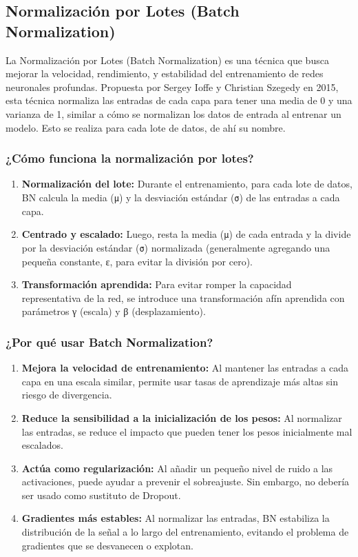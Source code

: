 \documentclass[11pt]{article}
\begin{document}
\subsection{Normalización por Lotes (Batch Normalization)}
\label{sec:org718c32e}
La Normalización por Lotes (Batch Normalization) es una técnica que
busca mejorar la velocidad, rendimiento, y estabilidad del entrenamiento
de redes neuronales profundas. Propuesta por Sergey Ioffe y Christian
Szegedy en 2015, esta técnica normaliza las entradas de cada capa para
tener una media de 0 y una varianza de 1, similar a cómo se normalizan
los datos de entrada al entrenar un modelo. Esto se realiza para cada
lote de datos, de ahí su nombre.

\subsubsection{¿Cómo funciona la normalización por lotes?}
\label{sec:org4655f71}
\begin{enumerate}
\item \textbf{Normalización del lote:} Durante el entrenamiento, para cada lote de
datos, BN calcula la media (\texttt{µ}) y la desviación estándar (\texttt{σ}) de
las entradas a cada capa.
\item \textbf{Centrado y escalado:} Luego, resta la media (\texttt{µ}) de cada entrada y
la divide por la desviación estándar (\texttt{σ}) normalizada (generalmente
agregando una pequeña constante, ε, para evitar la división por
cero).
\item \textbf{Transformación aprendida:} Para evitar romper la capacidad
representativa de la red, se introduce una transformación afín
aprendida con parámetros γ (escala) y β (desplazamiento).
\end{enumerate}

\subsubsection{¿Por qué usar Batch Normalization?}
\label{sec:orgb573865}
\begin{enumerate}
\item \textbf{Mejora la velocidad de entrenamiento:} Al mantener las entradas a
cada capa en una escala similar, permite usar tasas de aprendizaje
más altas sin riesgo de divergencia.

\item \textbf{Reduce la sensibilidad a la inicialización de los pesos:} Al
normalizar las entradas, se reduce el impacto que pueden tener los
pesos inicialmente mal escalados.

\item \textbf{Actúa como regularización:} Al añadir un pequeño nivel de ruido a
las activaciones, puede ayudar a prevenir el sobreajuste. Sin
embargo, no debería ser usado como sustituto de Dropout.

\item \textbf{Gradientes más estables:} Al normalizar las entradas, BN estabiliza
la distribución de la señal a lo largo del entrenamiento, evitando el
problema de gradientes que se desvanecen o explotan.
\end{enumerate}
\end{document}
